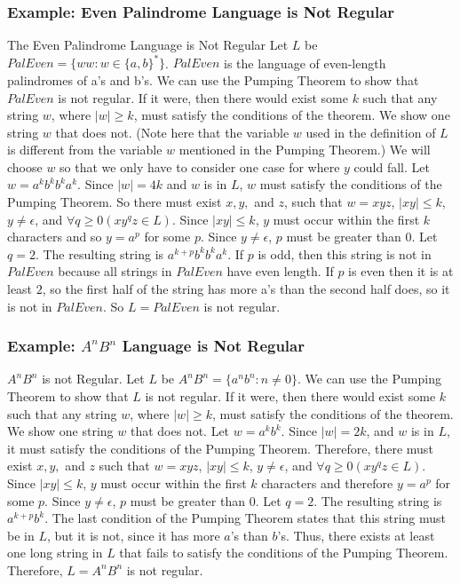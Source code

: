 \documentclass{article}
\begin{document}
\subsubsection{Example: Even Palindrome Language is Not Regular}

The Even Palindrome Language is Not Regular Let $L$ be $PalEven = \{ww : w \in
\{a, b\}^*\}$. $PalEven$ is the language of even-length palindromes of a’s and
b’s. We can use the Pumping Theorem to show that $PalEven$ is not regular. If
it were, then there would exist some $k$ such that any string $w$, where $|w|
\geq k$, must satisfy the conditions of the theorem. We show one string $w$
that does not. (Note here that the variable $w$ used in the definition of $L$
is different from the variable $w$ mentioned in the Pumping Theorem.) We will
choose $w$ so that we only have to consider one case for where $y$ could fall.
Let $w = a^kb^kb^ka^k$. Since $|w| = 4k$ and $w$ is in $L$, $w$ must satisfy
the conditions of the Pumping Theorem. So there must exist $x, y,$ and $z$,
such that $w = xyz$, $|xy| \leq k$, $y \neq \epsilon$, and $\forall q \geq 0
(xy^qz \in L)$. Since $|xy| \leq k$, $y$ must occur within the first $k$
characters and so $y = a^p$ for some $p$. Since $y \neq \epsilon$, $p$ must be
greater than $0$. Let $q = 2$. The resulting string is $a^{k+p}b^kb^ka^k$. If
$p$ is odd, then this string is not in $PalEven$ because all strings in
$PalEven$ have even length. If $p$ is even then it is at least $2$, so the
first half of the string has more a’s than the second half does, so it is not
in $PalEven$. So $L = PalEven$ is not regular.

\subsubsection{Example: $A^nB^n$ Language is Not Regular }

$A^nB^n$ is not Regular. Let $L$ be $A^nB^n = \{a^nb^n : n \neq 0\}$. We can
use the Pumping Theorem to show that $L$ is not regular. If it were, then there
would exist some $k$ such that any string $w$, where $|w| \geq k$, must satisfy
the conditions of the theorem. We show one string $w$ that does not. Let $w =
a^kb^k$. Since $|w| = 2k$, and $w$ is in $L$, it must satisfy the conditions of
the Pumping Theorem. Therefore, there must exist $x, y,$ and $z$ such that $w =
xyz$, $|xy| \leq k$, $y \neq \epsilon$, and $\forall q \geq 0 (xy^qz \in L)$.
Since $|xy| \leq k$, $y$ must occur within the first $k$ characters and
therefore $y = a^p$ for some $p$. Since $y \neq \epsilon$, $p$ must be greater
than $0$. Let $q = 2$. The resulting string is $a^{k+p}b^k$. The last condition
of the Pumping Theorem states that this string must be in $L$, but it is not,
since it has more $a$’s than $b$’s. Thus, there exists at least one long string
in $L$ that fails to satisfy the conditions of the Pumping Theorem. Therefore,
$L = A^nB^n$ is not regular.
\end{document}
